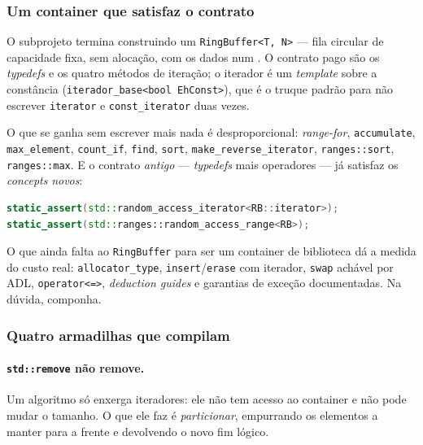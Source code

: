 \subsubsection{Um container que satisfaz o contrato}

O subprojeto termina construindo um \texttt{RingBuffer<T, N>} --- fila circular
de capacidade fixa, sem alocação, com os dados num . O
contrato pago são os \emph{typedefs} e os quatro métodos de iteração; o iterador
é um \emph{template} sobre a constância (\texttt{iterador\_base<bool EhConst>}),
que é o truque padrão para não escrever \texttt{iterator} e
\texttt{const\_iterator} duas vezes.

O que se ganha sem escrever mais nada é desproporcional: \emph{range-for},
\texttt{accumulate}, \texttt{max\_element}, \texttt{count\_if}, \texttt{find},
\texttt{sort}, \texttt{make\_reverse\_iterator}, \texttt{ranges::sort},
\texttt{ranges::max}. E o contrato \emph{antigo} --- \emph{typedefs} mais
operadores --- já satisfaz os \emph{concepts} \emph{novos}:

\begin{lstlisting}[style=bt, language=C++,
    caption={O contrato clássico satisfazendo os \emph{concepts} do C++20.}]
static_assert(std::random_access_iterator<RB::iterator>);
static_assert(std::ranges::random_access_range<RB>);
\end{lstlisting}

\begin{regra}
O que ainda falta ao \texttt{RingBuffer} para ser um container de biblioteca dá
a medida do custo real: \texttt{allocator\_type}, \texttt{insert}/\texttt{erase}
com iterador, \texttt{swap} achável por ADL, \texttt{operator<=>},
\emph{deduction guides} e garantias de exceção documentadas. Na dúvida,
componha.
\end{regra}

\subsubsection{Quatro armadilhas que compilam}

\paragraph{\texttt{std::remove} não remove.} Um algoritmo só enxerga
iteradores: ele não tem acesso ao container e não pode mudar o tamanho. O que
ele faz é \emph{particionar}, empurrando os elementos a manter para a frente e
devolvendo o novo fim lógico.

